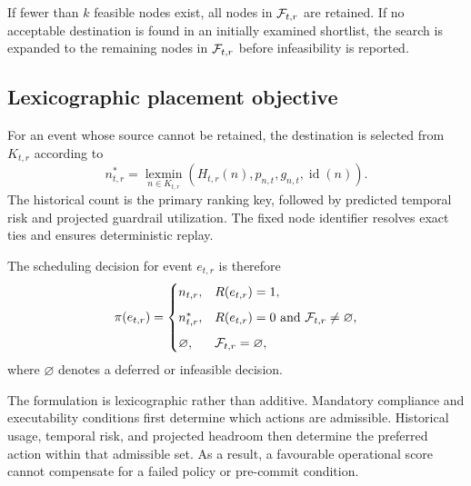 If fewer than $k$ feasible nodes exist, all nodes in $\mathcal{F}_{t,r}$ are
retained. If no acceptable destination is found in an initially examined
shortlist, the search is expanded to the remaining nodes in
$\mathcal{F}_{t,r}$ before infeasibility is reported.

\subsection{Lexicographic placement objective}

For an event whose source cannot be retained, the destination is selected
from $K_{t,r}$ according to
\begin{equation}
\label{eq:lexicographic}
    n_{t,r}^{*}
    =
    \operatorname*{lexmin}_{n\in K_{t,r}}
    \left(
        H_{t,r}(n),
        p_{n,t},
        g_{n,t},
        \operatorname{id}(n)
    \right).
\end{equation}
The historical count is the primary ranking key, followed by predicted
temporal risk and projected guardrail utilization. The fixed node
identifier resolves exact ties and ensures deterministic replay.

The scheduling decision for event $e_{t,r}$ is therefore
\begin{equation}
\label{eq:complete-decision}
    \pi(e_{t,r})
    =
    \begin{cases}
        n_{t,r},
        & R(e_{t,r})=1,\\[2mm]
        n_{t,r}^{*},
        & R(e_{t,r})=0
          \text{ and }
          \mathcal{F}_{t,r}\neq\varnothing,\\[2mm]
        \varnothing,
        & \mathcal{F}_{t,r}=\varnothing,
    \end{cases}
\end{equation}
where $\varnothing$ denotes a deferred or infeasible decision.

The formulation is lexicographic rather than additive. Mandatory
compliance and executability conditions first determine which actions
are admissible. Historical usage, temporal risk, and projected headroom
then determine the preferred action within that admissible set. As a
result, a favourable operational score cannot compensate for a failed
policy or pre-commit condition.